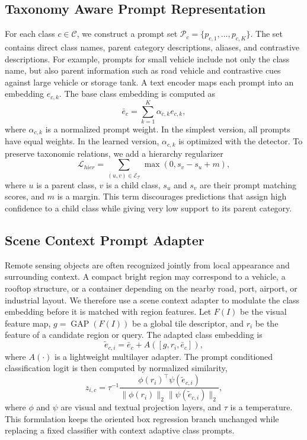 \documentclass[10pt]{article}
\begin{document}
\subsection{Taxonomy Aware Prompt Representation}

For each class $c \in \mathcal{C}$, we construct a prompt set $\mathcal{P}_c = \{p_{c,1}, \ldots, p_{c,K}\}$. The set contains direct class names, parent category descriptions, aliases, and contrastive descriptions. For example, prompts for small vehicle include not only the class name, but also parent information such as road vehicle and contrastive cues against large vehicle or storage tank. A text encoder maps each prompt into an embedding $e_{c,k}$. The base class embedding is computed as
\begin{equation}
    \bar{e}_c = \sum_{k=1}^{K} \alpha_{c,k} e_{c,k},
\end{equation}
where $\alpha_{c,k}$ is a normalized prompt weight. In the simplest version, all prompts have equal weights. In the learned version, $\alpha_{c,k}$ is optimized with the detector. To preserve taxonomic relations, we add a hierarchy regularizer
\begin{equation}
    \mathcal{L}_{hier}=\sum_{(u,v)\in \mathcal{E}_{\mathcal{T}}}
    \max(0, s_v - s_u + m),
\end{equation}
where $u$ is a parent class, $v$ is a child class, $s_u$ and $s_v$ are their prompt matching scores, and $m$ is a margin. This term discourages predictions that assign high confidence to a child class while giving very low support to its parent category.

\subsection{Scene Context Prompt Adapter}

Remote sensing objects are often recognized jointly from local appearance and surrounding context. A compact bright region may correspond to a vehicle, a rooftop structure, or a container depending on the nearby road, port, airport, or industrial layout. We therefore use a scene context adapter to modulate the class embedding before it is matched with region features. Let $F(I)$ be the visual feature map, $g=\operatorname{GAP}(F(I))$ be a global tile descriptor, and $r_i$ be the feature of a candidate region or query. The adapted class embedding is
\begin{equation}
    \tilde{e}_{c,i} = \bar{e}_{c} + A([g,r_i,\bar{e}_c]),
\end{equation}
where $A(\cdot)$ is a lightweight multilayer adapter. The prompt conditioned classification logit is then computed by normalized similarity,
\begin{equation}
    z_{i,c} = \tau^{-1}
    \frac{\phi(r_i)^\top \psi(\tilde{e}_{c,i})}
    {\|\phi(r_i)\|_2\|\psi(\tilde{e}_{c,i})\|_2},
\end{equation}
where $\phi$ and $\psi$ are visual and textual projection layers, and $\tau$ is a temperature. This formulation keeps the oriented box regression branch unchanged while replacing a fixed classifier with context adaptive class prompts.
\end{document}
